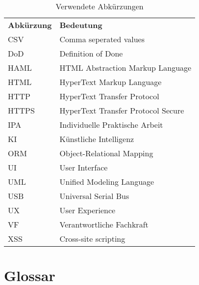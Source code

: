 \begin{table}[H]
    \begin{tabular}{|L{0.3\textwidth}|L{0.6\textwidth}|}
        \hline
         \textbf{\color{white}Abkürzung} & \textbf{\color{white}Bedeutung} \\[12pt]
        CSV & Comma seperated values \\
        \hline
        DoD & Definition of Done \\
        \hline
        HAML & HTML Abstraction Markup Language \\
        \hline
        HTML & HyperText Markup Language \\
        \hline
        HTTP & HyperText Transfer Protocol \\
        \hline
        HTTPS & HyperText Transfer Protocol Secure \\
        \hline
        IPA & Individuelle Praktische Arbeit \\
        \hline
        KI & Künstliche Intelligenz \\
        \hline
        ORM & Object-Relational Mapping \\
        \hline
        UI & User Interface \\
        \hline
        UML & Unified Modeling Language \\
        \hline
        USB & Universal Serial Bus \\
        \hline
        UX & User Experience \\
        \hline
        VF & Verantwortliche Fachkraft \\
        \hline
        XSS & Cross-site scripting \\
        \hline
    \end{tabular}
    \caption{Verwendete Abkürzungen}
\end{table}

\chapter{Glossar}

